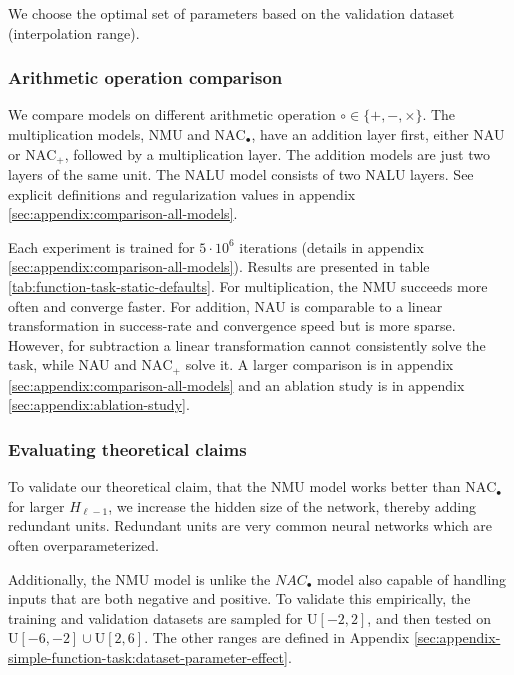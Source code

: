 We choose the optimal set of parameters based on the validation dataset (interpolation range).

\subsubsection{Arithmetic operation comparison}
We compare models on different arithmetic operation $\circ \in \{+, -, \times\}$. The multiplication models, NMU and $\mathrm{NAC}_{\bullet}$, have an addition layer first, either NAU or $\mathrm{NAC}_{+}$, followed by a multiplication layer. The addition models are just two layers of the same unit. The NALU model consists of two NALU layers. See explicit definitions and regularization values in appendix \ref{sec:appendix:comparison-all-models}.

Each experiment is trained for $5 \cdot 10^6$ iterations (details in appendix \ref{sec:appendix:comparison-all-models}). Results are presented in table \ref{tab:function-task-static-defaults}. For multiplication, the NMU succeeds more often and converge faster. For addition, NAU is comparable to a linear transformation in success-rate and convergence speed but is more sparse. However, for subtraction a linear transformation cannot consistently solve the task, while NAU and $\mathrm{NAC}_{+}$ solve it. A larger comparison is in appendix \ref{sec:appendix:comparison-all-models} and an ablation study is in appendix \ref{sec:appendix:ablation-study}.



\subsubsection{Evaluating theoretical claims}

To validate our theoretical claim, that the NMU model works better than $\mathrm{NAC}_{\bullet}$ for larger $H_{\ell-1}$, we increase the hidden size of the network, thereby adding redundant units. Redundant units are very common neural networks which are often overparameterized.

Additionally, the NMU model is unlike the $NAC_{\bullet}$ model also capable of handling inputs that are both negative and positive. To validate this empirically, the training and validation datasets are sampled for $\mathrm{U}[-2,2]$, and then tested on $\mathrm{U}[-6,-2] \cup \mathrm{U}[2,6]$. The other ranges are defined in Appendix \ref{sec:appendix-simple-function-task:dataset-parameter-effect}.

